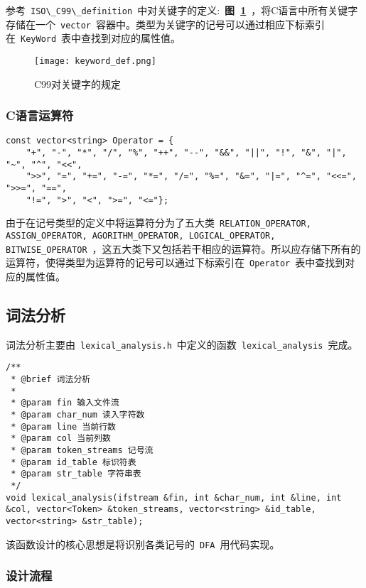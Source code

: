 \documentclass[lang=cn,11pt,a4paper]{paper}
\begin{document}
参考\ \lstinline{ISO\_C99\_definition}\ 中对关键字的定义:\ \textbf{图\ \ref{fig:C99对关键字的规定}}\ ，将C语言中所有关键字存储在一个\ \lstinline{vector}\ 容器中。类型为关键字的记号可以通过相应下标索引在\ \lstinline{KeyWord}\ 表中查找到对应的属性值。

\begin{figure}[!htb]
    \centering
    \texttt{[image: keyword\_def.png]}
    \caption{C99对关键字的规定}
    \label{fig:C99对关键字的规定}
\end{figure}

\subsubsection{C语言运算符}

\begin{lstlisting}
const vector<string> Operator = {
    "+", "-", "*", "/", "%", "++", "--", "&&", "||", "!", "&", "|", "~", "^", "<<",
    ">>", "=", "+=", "-=", "*=", "/=", "%=", "&=", "|=", "^=", "<<=", ">>=", "==",
    "!=", ">", "<", ">=", "<="};
\end{lstlisting}

由于在记号类型的定义中将运算符分为了五大类\ \lstinline{RELATION_OPERATOR, ASSIGN_OPERATOR, AGORITHM_OPERATOR, LOGICAL_OPERATOR, BITWISE_OPERATOR}\ ，这五大类下又包括若干相应的运算符。所以应存储下所有的运算符，使得类型为运算符的记号可以通过下标索引在\ \lstinline{Operator}\ 表中查找到对应的属性值。

\subsection{词法分析}
词法分析主要由\ \lstinline{lexical_analysis.h}\ 中定义的函数\ \lstinline{lexical_analysis}\ 完成。

\begin{lstlisting}
/**
 * @brief 词法分析
 * 
 * @param fin 输入文件流 
 * @param char_num 读入字符数
 * @param line 当前行数
 * @param col 当前列数
 * @param token_streams 记号流
 * @param id_table 标识符表
 * @param str_table 字符串表
 */
void lexical_analysis(ifstream &fin, int &char_num, int &line, int &col, vector<Token> &token_streams, vector<string> &id_table, vector<string> &str_table);
\end{lstlisting}

该函数设计的核心思想是将识别各类记号的\ \lstinline{DFA}\ 用代码实现。

\subsubsection{设计流程}
\end{document}
